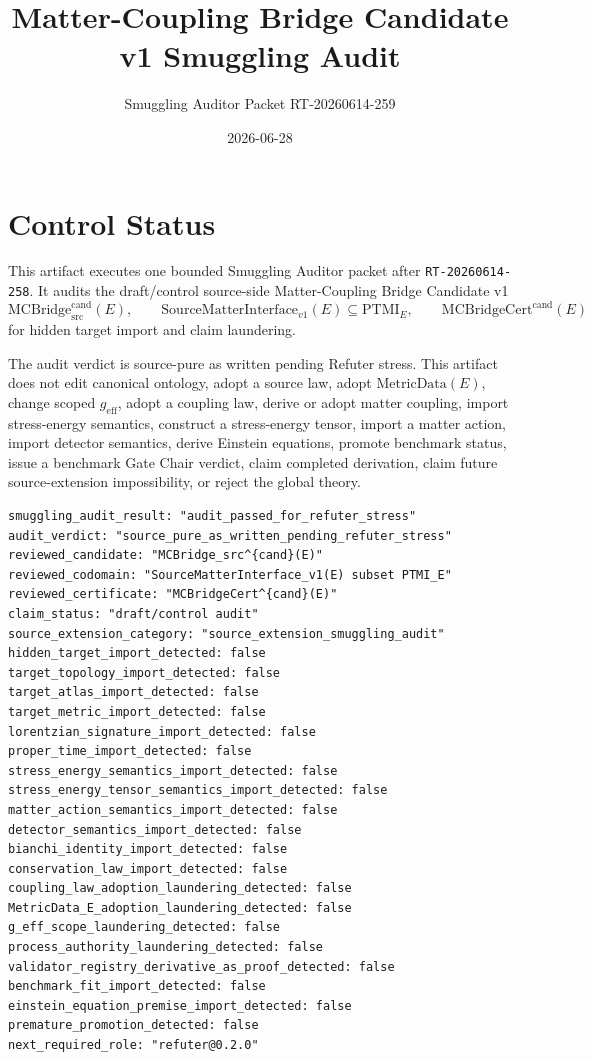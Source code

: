 \documentclass[11pt]{article}
\title{Matter-Coupling Bridge Candidate v1 Smuggling Audit}
\author{Smuggling Auditor Packet RT-20260614-259}
\date{2026-06-28}
\newcommand{\MetricData}{\mathrm{MetricData}}
\newcommand{\geff}{g_{\mathrm{eff}}}
\newcommand{\MCBridgeCand}{\mathrm{MCBridge}_{\mathrm{src}}^{\mathrm{cand}}}
\newcommand{\MCBridgeCertCand}{\mathrm{MCBridgeCert}^{\mathrm{cand}}}
\newcommand{\SMI}{\mathrm{SourceMatterInterface}_{v1}}
\newcommand{\PTMI}{\mathrm{PTMI}}
\begin{document}
\maketitle

\section{Control Status}

This artifact executes one bounded Smuggling Auditor packet after
\texttt{RT-20260614-258}. It audits the draft/control source-side
Matter-Coupling Bridge Candidate v1
\[
  \MCBridgeCand(E),
  \qquad
  \SMI(E)\subseteq\PTMI_E,
  \qquad
  \MCBridgeCertCand(E)
\]
for hidden target import and claim laundering.

The audit verdict is source-pure as written pending Refuter stress. This
artifact does not edit canonical ontology, adopt a source law, adopt
\(\MetricData(E)\), change scoped \(\geff\), adopt a coupling law, derive or
adopt matter coupling, import stress-energy semantics, construct a
stress-energy tensor, import a matter action, import detector semantics,
derive Einstein equations, promote benchmark status, issue a benchmark Gate
Chair verdict, claim completed derivation, claim future source-extension
impossibility, or reject the global theory.

\begin{verbatim}
smuggling_audit_result: "audit_passed_for_refuter_stress"
audit_verdict: "source_pure_as_written_pending_refuter_stress"
reviewed_candidate: "MCBridge_src^{cand}(E)"
reviewed_codomain: "SourceMatterInterface_v1(E) subset PTMI_E"
reviewed_certificate: "MCBridgeCert^{cand}(E)"
claim_status: "draft/control audit"
source_extension_category: "source_extension_smuggling_audit"
hidden_target_import_detected: false
target_topology_import_detected: false
target_atlas_import_detected: false
target_metric_import_detected: false
lorentzian_signature_import_detected: false
proper_time_import_detected: false
stress_energy_semantics_import_detected: false
stress_energy_tensor_semantics_import_detected: false
matter_action_semantics_import_detected: false
detector_semantics_import_detected: false
bianchi_identity_import_detected: false
conservation_law_import_detected: false
coupling_law_adoption_laundering_detected: false
MetricData_E_adoption_laundering_detected: false
g_eff_scope_laundering_detected: false
process_authority_laundering_detected: false
validator_registry_derivative_as_proof_detected: false
benchmark_fit_import_detected: false
einstein_equation_premise_import_detected: false
premature_promotion_detected: false
next_required_role: "refuter@0.2.0"
\end{verbatim}
\end{document}
